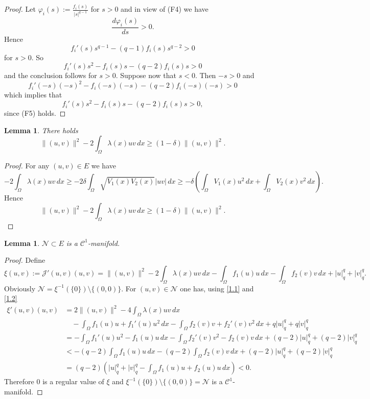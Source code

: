 \documentclass{scrartcl}
\newtheorem{Lem}[Th]{Lemma}
\newcommand{\cC}{{\mathcal C}}
\newcommand{\cJ}{{\mathcal J}}
\newcommand{\cN}{{\mathcal N}}
\numberwithin{equation}{section}
\begin{document}
\begin{proof}
Let $\varphi_i(s) := \frac{f_i(s)}{|s|^{q-1}}$ for $s > 0$ and in view of (F4) we have
$$
\frac{d \varphi_i (s)}{ds} > 0.
$$
Hence
$$
f_i'(s) s^{q-1} - (q-1) f_i (s) s^{q-2} > 0
$$
for $s > 0$. So
$$
f_i'(s) s^2 - f_i(s)s - (q-2) f_i(s) s > 0
$$
and the conclusion follows for $s > 0$. Suppose now that $s < 0$. Then $-s > 0$ and
$$
f_i'(-s) (-s)^2 - f_i(-s)(-s) - (q-2) f_i(-s) (-s) > 0
$$
which implies that
$$
f_i'(s) s^2 - f_i(s)s - (q-2) f_i(s)s > 0,
$$
since (F5) holds.
\end{proof}

\begin{Lem}
There holds
\begin{equation}\label{1.2}
\|(u,v)\|^2 - 2 \int_{\Omega} \lambda(x) uv \, dx \geq (1-\delta) \| (u,v) \|^2.
\end{equation}
\end{Lem}

\begin{proof}
For any $(u,v)\in E$ we have
$$
-2 \int_{\Omega} \lambda(x) uv \, dx  \geq -2\delta \int_{\Omega} \sqrt{V_1(x) V_2(x)} |uv| \, dx \geq -\delta \left( \int_{\Omega} V_1(x) u^2 \, dx + \int_{\Omega} V_2(x) v^2 \, dx \right).
$$
Hence
$$
\|(u,v)\|^2 - 2 \int_{\Omega} \lambda(x) uv \, dx \geq (1-\delta) \| (u,v) \|^2.
$$
\end{proof}

\begin{Lem}\label{lem:1.3}
$\cN \subset E$ is a $\cC^1$-manifold.
\end{Lem}

\begin{proof}
Define
$$
\xi(u,v) := \cJ'(u,v)(u,v) = \|(u,v)\|^2 - 2 \int_{ \Omega} \lambda(x) uv \, dx - \int_{ \Omega } f_1(u)u \, dx - \int_{ \Omega } f_2(v)v \, dx + |u|_q^q + |v|_q^q.
$$
Obviously $\cN = \xi^{-1} (\{ 0 \}) \setminus \{(0,0)\}$. For $(u,v) \in \cN$ one has, using \eqref{1.1} and \eqref{1.2}
\begin{align*}
\xi'(u,v)(u,v) &= 2 \| (u,v) \|^2 - 4 \int_{\Omega} \lambda(x) uv \, dx \\
&\quad - \int_{\Omega} f_1(u)u + f_1 ' (u) u^2 \, dx - \int_{\Omega} f_2(v)v + f_2 ' (v) v^2 \, dx + q |u|_q^q + q |v|_q^q \\
&= - \int_{\Omega} f_1 ' (u)u^2  - f_1(u)u\, dx - \int_{\Omega} f_2 ' (v)v^2 -f_2(v)v \, dx + (q-2) |u|_q^q + (q-2) |v|_q^q \\
&< - (q-2) \int_{\Omega} f_1(u)u \, dx - (q-2) \int_{\Omega} f_2(v)v  \, dx + (q-2) |u|_q^q + (q-2) |v|_q^q \\
&= (q-2) \left( |u|_q^q + |v|_q^q - \int_{\Omega} f_1(u)u + f_2(u)u \, dx \right) < 0.
\end{align*}
Therefore $0$ is a regular value of $\xi$ and $\xi^{-1}(\{0\}) \setminus \{(0,0)\} = \cN$ is a $\cC^1$-manifold.
\end{proof}
\end{document}
